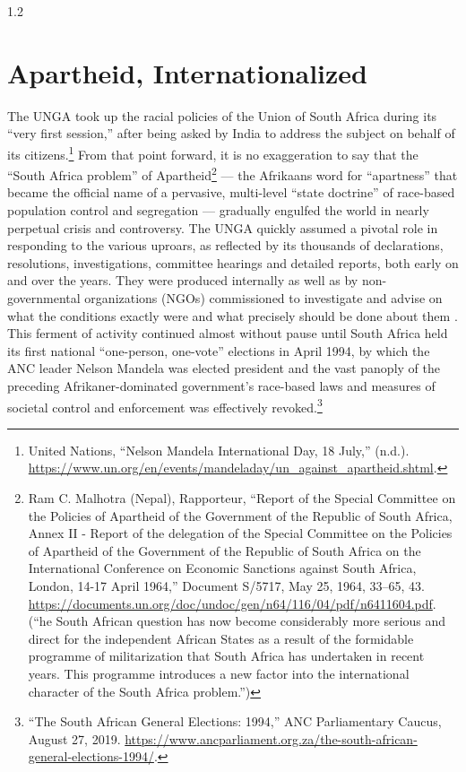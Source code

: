 \documentclass[../unravbook.tex]{subfiles}
\begin{document}
\begin{spacing}{1.2}

\setcounter{chapter}{1}
\setcounter{endnote}{0}

\chapter{Apartheid, Internationalized} %
    
The UNGA took up the racial policies of the Union of South Africa during its \enquote{very first session,} after being asked by India to address the subject on behalf of its citizens.\footnote{United Nations, \enquote{Nelson Mandela International Day, 18 July,} (n.d.). \url{https://www.un.org/en/events/mandeladay/un_against_apartheid.shtml}.} From that point forward, it is no exaggeration to say that the ``South Africa problem'' of Apartheid\footnote{Ram C. Malhotra (Nepal), Rapporteur, ``Report of the Special Committee on the Policies of Apartheid of the Government of the Republic of South Africa, Annex II - Report of the delegation of the Special Committee on the Policies of Apartheid of the Government of the Republic of South Africa on the International Conference on Economic Sanctions against South Africa, London, 14-17 April 1964,'' Document S/5717, May 25, 1964, 33--65, 43. \url{https://documents.un.org/doc/undoc/gen/n64/116/04/pdf/n6411604.pdf}.(\enquote{he South African question has now become considerably more serious and direct for the independent African States as a result of the formidable programme of militarization that South Africa has undertaken in recent years. This programme introduces a new factor into the international character of the South Africa problem.})} --- the Afrikaans word for \enquote{apartness} that became the official name of a pervasive, multi-level \enquote{state doctrine} of race-based population control and segregation \parencite[138]{Malhotra-1964} --- gradually engulfed the world in nearly perpetual crisis and controversy. The UNGA quickly assumed a pivotal role in responding to the various uproars, as reflected by its thousands of declarations, resolutions, investigations, committee hearings and detailed reports, both early on and over the years. They were produced internally as well as by non-governmental organizations (NGOs) commissioned to investigate and advise on what the conditions exactly were and what precisely should be done about them \parencite{Leiss-1965}. This ferment of activity continued almost without pause until South Africa held its first national \enquote{one-person, one-vote} elections in April 1994, by which the ANC leader Nelson Mandela was elected president and the vast panoply of the preceding Afrikaner-dominated government's race-based laws and measures of societal control and enforcement was effectively revoked.\footnote{``The South African General Elections: 1994,'' ANC Parliamentary Caucus, August 27, 2019. \url{https://www.ancparliament.org.za/the-south-african-general-elections-1994/}.} 


\end{spacing}
\end{document}
